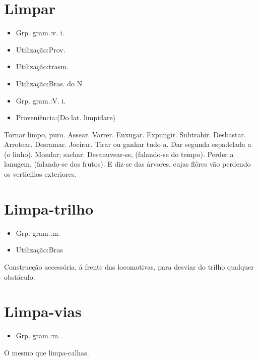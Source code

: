 \section{Limpar}
\begin{itemize}
\item {Grp. gram.:v. i.}
\end{itemize}
\begin{itemize}
\item {Utilização:Prov.}
\end{itemize}
\begin{itemize}
\item {Utilização:trasm.}
\end{itemize}
\begin{itemize}
\item {Utilização:Bras. do N}
\end{itemize}
\begin{itemize}
\item {Grp. gram.:V. i.}
\end{itemize}
\begin{itemize}
\item {Proveniência:(Do lat. \textunderscore limpidare\textunderscore )}
\end{itemize}
Tornar limpo, puro.
Assear.
Varrer.
Enxugar.
Expungir.
Subtrahir.
Desbastar.
Arrotear.
Desramar.
Joeirar.
Tirar ou ganhar tudo a.
Dar segunda espadelada a (o linho).
Mondar; sachar.
Desanuvear-se, (falando-se do tempo).
Perder a lanugem, (falando-se dos frutos).
E diz-se das árvores, cujas flôres vão perdendo os verticillos exteriores.
\section{Limpa-trilho}
\begin{itemize}
\item {Grp. gram.:m.}
\end{itemize}
\begin{itemize}
\item {Utilização:Bras}
\end{itemize}
Construcção accessória, á frente das locomotivas, para desviar do trilho qualquer obstáculo.
\section{Limpa-vias}
\begin{itemize}
\item {Grp. gram.:m.}
\end{itemize}
O mesmo que \textunderscore limpa-calhas\textunderscore .
